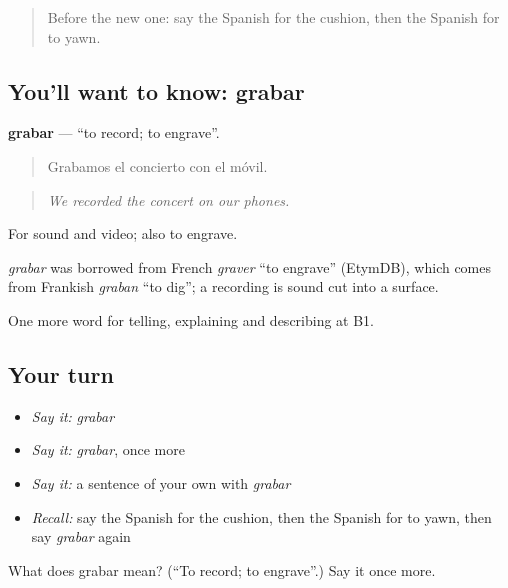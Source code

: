 \label{lesson:ES-C761-grabar}



\begin{quote}
Before the new one: say the Spanish for the cushion, then the Spanish for to yawn.
\end{quote}

\subsection*{You'll want to know: grabar}
\textbf{grabar} — \textquotedblleft{}to record; to engrave\textquotedblright{}.

\begin{quote}
Grabamos el concierto con el móvil.
\end{quote}

\begin{quote}
\emph{We recorded the concert on our phones.}
\end{quote}

For sound and video; also to engrave.

\begin{cousinweb}
\emph{grabar} was borrowed from French \emph{graver} \textquotedblleft{}to engrave\textquotedblright{} (EtymDB), which comes from Frankish \emph{graban} \textquotedblleft{}to dig\textquotedblright{}; a recording is sound cut into a surface.
\end{cousinweb}

\begin{grammarlens}[title={What you've built}]
One more word for telling, explaining and describing at B1.
\end{grammarlens}

\subsection*{Your turn}
\begin{itemize}
\raggedright
  \item \emph{Say it:} \emph{grabar}
  \item \emph{Say it:} \emph{grabar}, once more
  \item \emph{Say it:} a sentence of your own with \emph{grabar}
  \item \emph{Recall:} say the Spanish for the cushion, then the Spanish for to yawn, then say \emph{grabar} again
\end{itemize}

\begin{tcolorbox}[breakable,colback=teal!4,colframe=teal!35!black,title={Before you move on}]
What does grabar mean? (\textquotedblleft{}To record; to engrave\textquotedblright{}.) Say it once more.
\end{tcolorbox}
